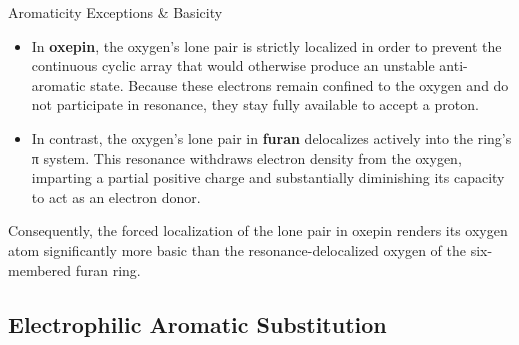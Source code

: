 \begin{core}{Aromaticity Exceptions \& Basicity}
\begin{itemize}
        \item In \textbf{oxepin}, the oxygen's lone pair is strictly localized in order to prevent the continuous cyclic array that would otherwise produce an unstable anti-aromatic state. Because these electrons remain confined to the oxygen and do not participate in resonance, they stay fully available to accept a proton.

        \item In contrast, the oxygen's lone pair in \textbf{furan} delocalizes actively into the ring's π system. This resonance withdraws electron density from the oxygen, imparting a partial positive charge and substantially diminishing its capacity to act as an electron donor.

      \end{itemize}

      Consequently, the forced localization of the lone pair in oxepin renders its oxygen atom significantly more basic than the resonance-delocalized oxygen of the six-membered furan ring.

    \end{core}

  \subsection{Electrophilic Aromatic Substitution}
    \label{sec:eas}

